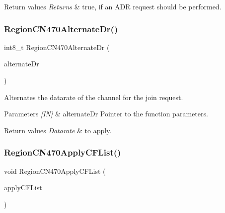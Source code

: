 \begin{DoxyRetVals}{Return values}
{\em Returns} & true, if an A\+DR request should be performed. \\
\hline
\end{DoxyRetVals}
\mbox{\label{group__REGIONCN470_ga5d07deb9b6a4c9a214439edae58bf341}} 
\subsubsection{\texorpdfstring{Region\+C\+N470\+Alternate\+Dr()}{RegionCN470AlternateDr()}}
{\footnotesize\ttfamily int8\+\_\+t Region\+C\+N470\+Alternate\+Dr (\begin{DoxyParamCaption}\item[{\hyperlink{group__REGION_ga001ea4338d1c83f4c785b49d7ad2d696}{Alternate\+Dr\+Params\+\_\+t} $\ast$}]{alternate\+Dr }\end{DoxyParamCaption})}



Alternates the datarate of the channel for the join request. 


\begin{DoxyParams}{Parameters}
{\em \mbox{[}\+I\+N\mbox{]}} & alternate\+Dr Pointer to the function parameters.\\
\hline
\end{DoxyParams}

\begin{DoxyRetVals}{Return values}
{\em Datarate} & to apply. \\
\hline
\end{DoxyRetVals}
\mbox{\label{group__REGIONCN470_gae0ca4a5d6bf63fdb278a132ec496649f}} 
\subsubsection{\texorpdfstring{Region\+C\+N470\+Apply\+C\+F\+List()}{RegionCN470ApplyCFList()}}
{\footnotesize\ttfamily void Region\+C\+N470\+Apply\+C\+F\+List (\begin{DoxyParamCaption}\item[{\hyperlink{group__REGION_ga71588e9ad07e34b78fa91d51881fd3c6}{Apply\+C\+F\+List\+Params\+\_\+t} $\ast$}]{apply\+C\+F\+List }\end{DoxyParamCaption})}



